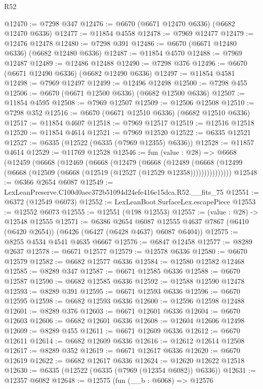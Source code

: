 \begin{lexlean}{R52}
\begin{coremodule}
@12470 := @7298 @347
@12476 := @6670 (@6671 @12470 @6336) (@6682 @12470 @6336)
@12477 := @11854 @4558
@12478 := @7969 @12477
@12479 := @12476 @12478
@12480 := @7298 @391
@12486 := @6670 (@6671 @12480 @6336) (@6682 @12480 @6336)
@12487 := @11854 @4570
@12488 := @7969 @12487
@12489 := @12486 @12488
@12490 := @7298 @376
@12496 := @6670 (@6671 @12490 @6336) (@6682 @12490 @6336)
@12497 := @11854 @4581
@12498 := @7969 @12497
@12499 := @12496 @12498
@12500 := @7298 @455
@12506 := @6670 (@6671 @12500 @6336) (@6682 @12500 @6336)
@12507 := @11854 @4595
@12508 := @7969 @12507
@12509 := @12506 @12508
@12510 := @7298 @352
@12516 := @6670 (@6671 @12510 @6336) (@6682 @12510 @6336)
@12517 := @11854 @4607
@12518 := @7969 @12517
@12519 := @12516 @12518
@12520 := @11854 @4614
@12521 := @7969 @12520
@12522 := @6335 @12521
@12527 := @6335 (@12522 (@6335 (@7969 @12355) @6336))
@12528 := @11857 @4614
@12529 := @11769 @12528
@12546 := fun (value : @28) =>
  @6668
    (@12459
      (@6668
        (@12469
          (@6668
            (@12479
              (@6668
                (@12489
                  (@6668 (@12499 (@6668 (@12509 (@6668 (@12519 (@12527 (@12529 @12358)))))))))))))))
@12548 := @6366 @2654 @6087
@12549 := LexLeanPreserve.C100d0aec372b51094d24efe416e15dca.R52.__fits_75
@12551 := @6372 (@12549 @6073)
@12552 := LexLeanBoot.SurfaceLex.escapePiece
@12553 := @12552 @6073
@12555 := @12551 (@198 @12553)
@12557 := (value : @28) -> @12548 @12555
@12571 := @6386
    @2654
    @6087
    @12555
    @4637
    @7867
    (@6410 (@6420 @2654))
    (@6426 (@6427 (@6428 @4637) @6087 @6404))
@12575 := @8255 @4534 @4541 @4635 @6667
@12576 := @6847 @12458
@12577 := @8289 @2637
@12578 := @6671 @12577
@12579 := @12578 @6336
@12580 := @6670 @12579
@12582 := @6682 @12577 @6336
@12584 := @12580 @12582 @12468
@12585 := @8289 @347
@12587 := @6671 @12585 @6336
@12588 := @6670 @12587
@12590 := @6682 @12585 @6336
@12592 := @12588 @12590 @12478
@12593 := @8289 @391
@12595 := @6671 @12593 @6336
@12596 := @6670 @12595
@12598 := @6682 @12593 @6336
@12600 := @12596 @12598 @12488
@12601 := @8289 @376
@12603 := @6671 @12601 @6336
@12604 := @6670 @12603
@12606 := @6682 @12601 @6336
@12608 := @12604 @12606 @12498
@12609 := @8289 @455
@12611 := @6671 @12609 @6336
@12612 := @6670 @12611
@12614 := @6682 @12609 @6336
@12616 := @12612 @12614 @12508
@12617 := @8289 @352
@12619 := @6671 @12617 @6336
@12620 := @6670 @12619
@12622 := @6682 @12617 @6336
@12624 := @12620 @12622 @12518
@12630 := @6335 (@12522 (@6335 (@7969 (@12354 @6082)) @6336))
@12631 := @12357 @6082
@12648 := @12575
    (fun (__b : @6068) =>
    @12576

\end{coremodule}
\end{lexlean}

